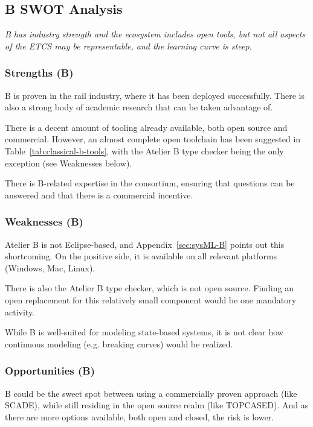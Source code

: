 \subsection{B SWOT Analysis}

\emph{B has industry strength and the ecosystem includes open tools, but not all aspects of the ETCS may be representable, and the learning curve is steep.}

\subsubsection{Strengths (B)}

B is proven in the rail industry, where it has been deployed successfully.  There is also a strong body of academic research that can be taken advantage of.

There is a decent amount of tooling already available, both open source and commercial.  However, an almost complete open toolchain has been suggested in Table~\ref{tab:classical-b-tools}, with the Atelier B type checker being the only exception (see Weaknesses below).

There is B-related expertise in the consortium, ensuring that questions can be answered and that there is a commercial incentive.

\subsubsection{Weaknesses (B)}

Atelier B is not Eclipse-based, and Appendix~\ref{sec:sysML-B} points out this shortcoming.  On the positive side, it is available on all relevant platforms (Windows, Mac, Linux).

There is also the Atelier B type checker, which is not open source.  Finding an open replacement for this relatively small component would be one mandatory activity.

While B is well-suited for modeling state-based systems, it is not clear how continuous modeling (e.g. breaking curves) would be realized.


\subsubsection{Opportunities (B)}

B could be the sweet spot between using a commercially proven approach (like SCADE), while still residing in the open source realm (like TOPCASED).  And as there are more options available, both open and closed, the risk is lower.

